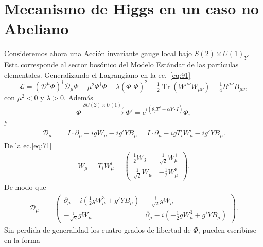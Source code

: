 \section{Mecanismo de Higgs en un caso no Abeliano}
\label{sec:mecanismo-de-higgs}

Consideremos ahora una Acci\'on invariante gauge local bajo $S(2)\times U(1)_Y$. Esta corresponde al sector bos\'onico del Modelo Est\'andar de las part\'\i culas elementales. Generalizando el Lagrangiano en la ec.~\eqref{eq:91}
\begin{equation}
\label{eq:97}
  \mathcal{L}=\left(\mathcal{D}^\mu\Phi\right)^\dagger\mathcal{D}_\mu\Phi-\mu^2\Phi^\dagger \Phi-\lambda\left(\Phi^\dagger \Phi\right)^2-\tfrac{1}{2}\operatorname{Tr}\left(W^{\mu\nu}W_{\mu\nu}\right)-\tfrac{1}{4}B^{\mu\nu}B_{\mu\nu},
\end{equation}
con $\mu^2\lt 0$ y $\lambda\gt 0$. Adem\'as
\begin{equation}
\label{eq:93}
  \Phi\overset{SU(2)\times U(1)_Y}{\longrightarrow}\Phi'=e^{i(\theta_jT^j+\alpha Y\cdot I)}\Phi,
\end{equation}
y
\begin{align}
\mathcal{D}_\mu&=I\cdot\partial_\mu-i g W_\mu-i g' Y B_\mu=I\cdot\partial_\mu-i g T_i W_\mu^i-i g' Y B_\mu.
\end{align}
De la ec.\eqref{eq:71}
\begin{align}
      W_\mu=T_i W^{i}_\mu=\begin{pmatrix}
    \frac{1}{2}W_3&\frac{1}{\sqrt{2}}W^+_\mu\\
    \frac{1}{\sqrt{2}}W^-_\mu&-\frac{1}{2}W^3_\mu
  \end{pmatrix}.
\end{align}
De modo que
\begin{align}
 \mathcal{D}_\mu &=  \begin{pmatrix}
    \partial_\mu-i\left(\frac{1}{2}g W^3_\mu+g' Y B_\mu\right)&-\frac{i}{\sqrt{2}}g W^+_\mu\\
    -\frac{i}{\sqrt{2}}g W^-_\mu&\partial_\mu-i\left(-\frac{1}{2}g W^3_\mu+g'Y B_\mu\right)
  \end{pmatrix}.
\end{align}
Sin perdida de generalidad los cuatro grados de libertad de $\Phi$, pueden escribirse en la forma
